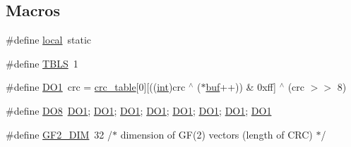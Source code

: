 \subsection*{Macros}
\begin{DoxyCompactItemize}
\item 
\#define \mbox{\hyperlink{third-party_2zlib_2crc32_8c_a08023ea6765c99d60a6a3840cd07156e}{local}}~static
\item 
\#define \mbox{\hyperlink{third-party_2zlib_2crc32_8c_a0249fed12d0a7eab9daea105c257da86}{T\+B\+LS}}~1
\item 
\#define \mbox{\hyperlink{third-party_2zlib_2crc32_8c_aff265ea9630e020c8ac850c18d5d972f}{D\+O1}}~crc = \mbox{\hyperlink{crc32_8h_a986309491edc1f872ec298c2c5fa5157}{crc\+\_\+table}}\mbox{[}0\mbox{]}\mbox{[}((\mbox{\hyperlink{ioapi_8h_a787fa3cf048117ba7123753c1e74fcd6}{int}})crc $^\wedge$ ($\ast$\mbox{\hyperlink{ioapi_8h_a8ad8a13c88886b9f623034ff88570adb}{buf}}++)) \& 0xff\mbox{]} $^\wedge$ (crc $>$$>$ 8)
\item 
\#define \mbox{\hyperlink{third-party_2zlib_2crc32_8c_aed1b41414efee0773c67c28e09317455}{D\+O8}}~\mbox{\hyperlink{third-party_2zlib_2crc32_8c_aff265ea9630e020c8ac850c18d5d972f}{D\+O1}}; \mbox{\hyperlink{third-party_2zlib_2crc32_8c_aff265ea9630e020c8ac850c18d5d972f}{D\+O1}}; \mbox{\hyperlink{third-party_2zlib_2crc32_8c_aff265ea9630e020c8ac850c18d5d972f}{D\+O1}}; \mbox{\hyperlink{third-party_2zlib_2crc32_8c_aff265ea9630e020c8ac850c18d5d972f}{D\+O1}}; \mbox{\hyperlink{third-party_2zlib_2crc32_8c_aff265ea9630e020c8ac850c18d5d972f}{D\+O1}}; \mbox{\hyperlink{third-party_2zlib_2crc32_8c_aff265ea9630e020c8ac850c18d5d972f}{D\+O1}}; \mbox{\hyperlink{third-party_2zlib_2crc32_8c_aff265ea9630e020c8ac850c18d5d972f}{D\+O1}}; \mbox{\hyperlink{third-party_2zlib_2crc32_8c_aff265ea9630e020c8ac850c18d5d972f}{D\+O1}}
\item 
\#define \mbox{\hyperlink{third-party_2zlib_2crc32_8c_a366ddceacb9041c5f12bb75fa6d75163}{G\+F2\+\_\+\+D\+IM}}~32      /$\ast$ dimension of GF(2) vectors (length of C\+RC) $\ast$/
\end{DoxyCompactItemize}
